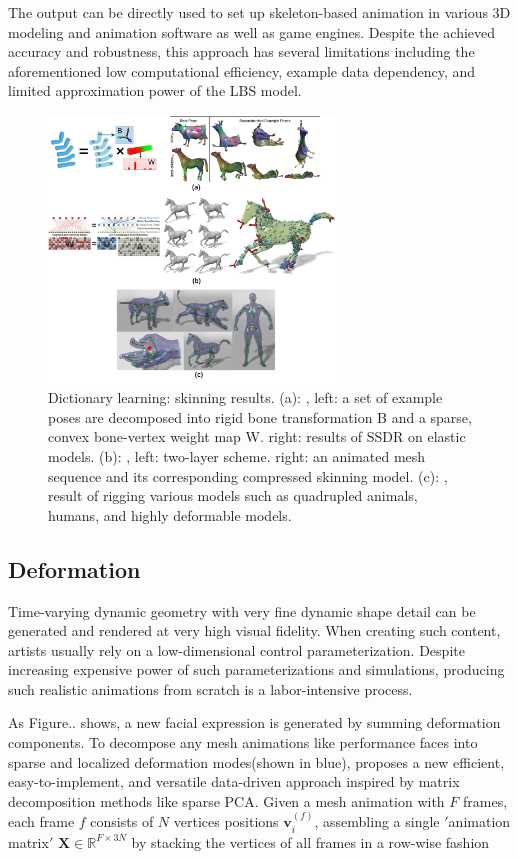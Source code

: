 The output can be directly used to set up skeleton-based animation in various 3D modeling and animation software as well as game engines. Despite the achieved accuracy and robustness, this approach has several limitations including the aforementioned low computational efficiency, example data dependency, and limited approximation power of the LBS model.


\begin{figure}[ht]
  \centering
  \includegraphics[width=3in]{images/skinning_decomposition}
  \caption{Dictionary learning: skinning results. (a): \cite{le2012smooth}, left: a set of example poses are decomposed into rigid bone transformation B and a sparse, convex bone-vertex weight map W. right: results of SSDR on elastic models. (b): \cite{le2013two}, left: two-layer scheme. right: an animated mesh sequence and its corresponding compressed skinning model. (c): \cite{le2014ras}, result of rigging various models such as quadrupled animals, humans, and highly deformable models.}
\end{figure}


\subsection{Deformation}

Time-varying dynamic geometry with very fine dynamic shape detail can be generated and rendered at very high visual fidelity.
When creating such content, artists usually rely on a low-dimensional control parameterization.
Despite increasing expensive power of such parameterizations and simulations, producing such realistic animations from scratch is a labor-intensive process.

As Figure.. shows, a new facial expression is generated by summing deformation components.
To decompose any mesh animations like performance faces into sparse and localized deformation modes(shown in blue),
\cite{neumann2013sparse} proposes a new efficient, easy-to-implement, and versatile data-driven approach inspired by matrix decomposition methods like sparse PCA\cite{zou2006sparse}.
Given a mesh animation with $F$ frames, each frame $f$ consists of $N$ vertices positions $\mathbf{v}{_{i}^{(f)}}$, assembling a single $'$animation matrix$'$ $\mathbf{X}\in \mathbb{R}^{F\times 3N}$ by stacking the vertices of all frames in a row-wise fashion

